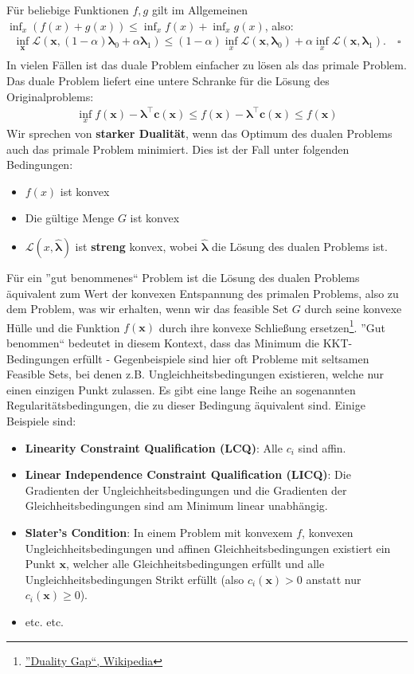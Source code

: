 \documentclass{report}
\newcommand{\tbf}{\textbf}
\begin{document}
Für beliebige Funktionen $f,g$ gilt im Allgemeinen $\inf_x(f(x) + g(x)) \leq \inf_x f(x) + \inf_x g(x)$, also:
\begin{align*}
 \inf_{\bm{x}}\mathcal{L}(\bm{x}, (1-\alpha)\bm{\lambda}_0 + \alpha \bm{\lambda}_1) \leq (1- \alpha) \inf_{x}  \mathcal{L}(\bm{x},\bm{\lambda}_0) +  \alpha \inf_{x} \mathcal{L}(\bm{x},\bm{\lambda}_1). \quad \square\\
\end{align*}
In vielen Fällen ist das duale Problem einfacher zu lösen als das primale Problem. Das duale Problem liefert eine untere Schranke für die Lösung des Originalproblems:
\begin{align*}
 \inf_{x} f(\bm{x}) - \bm{\lambda}^\top \bm{c(x)} \leq f(\bm{x}) - \bm{\lambda}^\top \bm{c}(\bm{x}) \leq f(\bm{x})
\end{align*}
Wir sprechen von \tbf{starker Dualität}, wenn das Optimum des dualen Problems auch das primale Problem minimiert. Dies ist der Fall unter folgenden Bedingungen:
\begin{itemize}
 \item $f(x)$ ist konvex
 \item Die gültige Menge $G$ ist  konvex
 \item $\mathcal{L}(x, \hat{\bm{\lambda}})$ ist \tbf{streng} konvex, wobei $\hat{\bm{\lambda}}$ die Lösung des dualen Problems ist.
\end{itemize}
Für ein ''gut benommenes`` Problem ist die Lösung des dualen Problems äquivalent zum Wert der konvexen Entspannung des primalen Problems, also zu dem Problem, was wir erhalten, wenn wir das feasible Set $G$ durch seine konvexe Hülle und die Funktion $f(\bm{x})$ durch ihre konvexe Schließung ersetzen\footnote{\href{https://en.wikipedia.org/wiki/Duality_gap?useskin=vector}{''Duality Gap``, Wikipedia}}. ''Gut benommen`` bedeutet in diesem Kontext, dass das Minimum die KKT-Bedingungen erfüllt - Gegenbeispiele sind hier oft Probleme mit seltsamen Feasible Sets, bei denen z.B. Ungleichheitsbedingungen existieren, welche nur einen einzigen Punkt zulassen. Es gibt eine lange Reihe an sogenannten Regularitätsbedingungen, die zu dieser Bedingung äquivalent sind. Einige Beispiele sind:
\begin{itemize}
 \item \tbf{Linearity Constraint Qualification (LCQ)}: Alle $c_i$ sind affin.
 \item \tbf{Linear Independence Constraint Qualification (LICQ)}: Die Gradienten der Ungleichheitsbedingungen und die Gradienten der Gleichheitsbedingungen sind am Minimum linear unabhängig.
 \item \tbf{Slater's Condition}: In einem Problem mit konvexem $f$, konvexen Ungleichheitsbedingungen und affinen Gleichheitsbedingungen existiert ein Punkt $\bm{x}$, welcher alle Gleichheitsbedingungen erfüllt und alle Ungleichheitsbedingungen Strikt erfüllt (also $c_i(\bm{x}) > 0$ anstatt nur $c_i(\bm{x}) \geq 0$).
 \item etc. etc.
\end{itemize}
\end{document}

